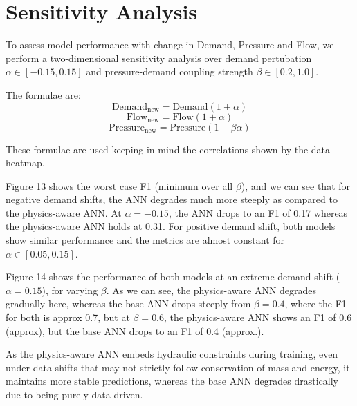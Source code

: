 \documentclass[final,5p,times,twocolumn,authoryear]{elsarticle}
\begin{document}
\section{Sensitivity Analysis}

To assess model performance with change in Demand, Pressure and Flow, we perform a two-dimensional sensitivity analysis over demand pertubation $\alpha \in [-0.15, 0.15]$ and pressure-demand coupling strength $\beta \in [0.2, 1.0]$.

The formulae are:
\[
\text{Demand}_{\text{new}} = \text{Demand}(1 + \alpha)
\]
\[
\text{Flow}_{\text{new}} = \text{Flow}(1 + \alpha)
\]
\[
\text{Pressure}_{\text{new}} = \text{Pressure}(1 - \beta\alpha)
\]

These formulae are used keeping in mind the correlations shown by the data heatmap.

Figure 13 shows the worst case F1 (minimum over all $\beta$), and we can see that for negative demand shifts, the ANN degrades much more steeply as compared to the physics-aware ANN. At $\alpha = -0.15$, the ANN drops to an F1 of 0.17 whereas the physics-aware ANN holds at 0.31. For positive demand shift, both models show similar performance and the metrics are almost constant for $\alpha \in [0.05, 0.15]$.

Figure 14 shows the performance of both models at an extreme demand shift ($\alpha = 0.15$), for varying $\beta$. As we can see, the physics-aware ANN degrades gradually here, whereas the base ANN drops steeply from $\beta = 0.4$, where the F1 for both is approx 0.7, but at $\beta = 0.6$, the physics-aware ANN shows an F1 of 0.6 (approx), but the base ANN drops to an F1 of 0.4 (approx.).

As the physics-aware ANN embeds hydraulic constraints during training, even under data shifts that may not strictly follow conservation of mass and energy, it maintains more stable predictions, whereas the base ANN degrades drastically due to being purely data-driven.
\end{document}
